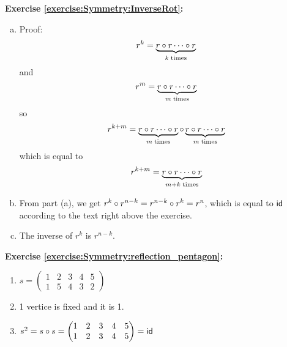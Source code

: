 \noindent\textbf{Exercise \ref{exercise:Symmetry:InverseRot}:}
\begin{enumerate}[(a)]
\item
Proof:
\[
r^k =  \underbrace{r \circ r \cdots \circ r}_{k \; {\rm times}}
\]
and
\[
r^m =  \underbrace{r \circ r \cdots \circ r}_{m \; {\rm times}}
\]
so
\[
r^{k+m} =  \underbrace{r \circ r \cdots \circ r}_{m \; {\rm times}} \circ 
\underbrace{r \circ r \cdots \circ r}_{m \; {\rm times}}
\]
which is equal to
\[
r^{k+m} =  \underbrace{r \circ r \cdots \circ r}_{m+k \; {\rm times}}
\]

\item
From part (a), we get  $r^k \circ r^{n-k} = r^{n-k} \circ r^k = r^n$, which is equal to ${\sf{i}d}$ according to the text right above the exercise.

\item
The inverse of $r^k$ is $r^{n-k}$.
\end{enumerate}

\noindent\textbf{Exercise \ref{exercise:Symmetry:reflection_pentagon}:}
\begin{enumerate}[{a.}]
\item
$s =\begin{pmatrix}
	1 & 2 & 3 & 4 & 5\\
	1 & 5 & 4 & 3 & 2
	\end{pmatrix}$
	
\item
1 vertice is fixed and it is 1.

\item
$s^2 = s \circ s =\begin{pmatrix}
	1 & 2 & 3 & 4 & 5\\
	1 & 2 & 3 & 4 & 5
	\end{pmatrix} = \sf{id}$
\end{enumerate}

